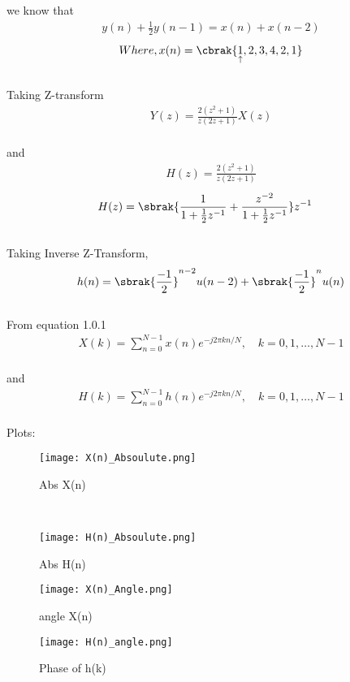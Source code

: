 \documentclass[journal,12pt,twocolumn]{IEEEtran}
\begin{document}
we know that \\
\begin{align}
    y(n) + \frac{1}{2}y(n-1) = x(n) + x(n-2)
\end{align}
\begin{align}
   Where, x(n) = \cbrak{\underset{\uparrow}{1},2,3,4,2,1} 
\end{align}\\
Taking Z-transform \\
\begin{align}
Y(z)=\frac{2(z^2+1)}{z(2z+1)}X(z)
\end{align}\\
and 
\begin{align}
H(z) = \frac{2(z^2+1)}{z(2z+1)} 
\end{align}
\begin{align}
H(z) &= \sbrak{\frac{1}{1+\frac{1}{2}z^{-1}} + \frac{z^{-2}}{1+\frac{1}{2}z^{-1}}}z^{-1}
\end{align}\\
Taking Inverse Z-Transform,\\
\begin{align}
    h(n)= \sbrak{\frac{-1}{2}}^{n-2}u(n-2) + \sbrak{\frac{-1}{2}}^nu(n)
\end{align}\\
From equation 1.0.1 \\
\begin{align}
    X(k) = \sum_{n=0}^{N-1} x(n) e^{-j 2 \pi k n / N}, \quad k=0,1, \ldots, N-1
\end{align}\\
and \\
\begin{align}
    H(k) = \sum_{n=0}^{N-1} h(n) e^{-j 2 \pi k n / N}, \quad k=0,1, \ldots, N-1
\end{align}\\
Plots:\
\vspace{5cm}

\begin{figure}[!h]
    \centering
    \texttt{[image: X(n)\_Absoulute.png]}
    \caption{Abs X(n)}
    \label{/_X(k)}
\end{figure} \\
\newpage
\begin{figure}
    \centering
    \texttt{[image: H(n)\_Absoulute.png]}
    \caption{Abs H(n)}

\end{figure}
\begin{figure}
    \centering
    \texttt{[image: X(n)\_Angle.png]}
    \caption{angle X(n)}
    
\end{figure} 
\begin{figure}
    \centering
    \texttt{[image: H(n)\_angle.png]}
    \caption{Phase of h(k)}
    
\end{figure} 
\end{document}
